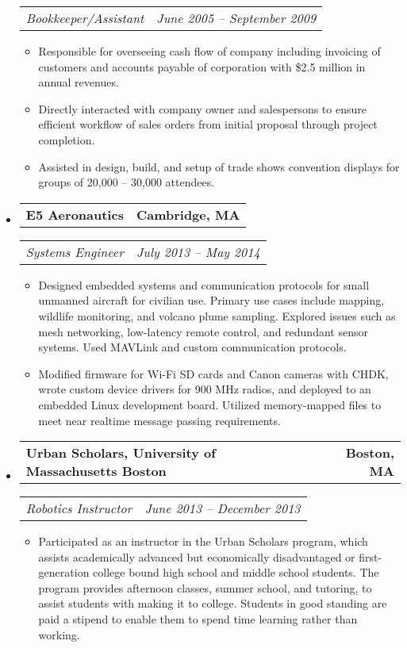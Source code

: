 \documentclass[10pt,letterpaper]{article}
\makeatletter
\newcommand{\headerrow}[2]
{\begin{tabular*}{\linewidth}{l@{\extracolsep{\fill}}r}
	#1 & #2 \\
\end{tabular*}}
\makeatother
\begin{document}
\begin{itemize}
	\headerrow
		{\emph{Bookkeeper/Assistant}}
		{\emph{June 2005 -- September 2009}}
	\begin{itemize}
        \item Responsible for overseeing cash flow of company including
            invoicing of customers and accounts payable of corporation with
            \$2.5 million in annual revenues.

        \item Directly interacted with company owner and salespersons to ensure
            efficient workflow of sales orders from initial proposal through
            project completion.

        \item Assisted in design, build, and setup of trade shows convention
            displays for groups of 20,000 -- 30,000 attendees.
	\end{itemize}

    \item
    \headerrow
		{\textbf{E5 Aeronautics}}
		{\textbf{Cambridge, MA}}
	\headerrow
		{\emph{Systems Engineer}}
		{\emph{July 2013 -- May 2014}}
    \begin{itemize}
        \item Designed embedded systems and communication protocols for small
            unmanned aircraft for civilian use.  Primary use cases include
            mapping, wildlife monitoring, and volcano plume sampling.  Explored
            issues such as mesh networking, low-latency remote control, and
            redundant sensor systems.  Used MAVLink and custom communication
            protocols.

        \item Modified firmware for Wi-Fi SD cards and Canon cameras with CHDK,
            wrote custom device drivers for 900 MHz radios, and deployed to an
            embedded Linux development board.  Utilized memory-mapped files to
            meet near realtime message passing requirements.
    \end{itemize}

    \item
    \headerrow
		{\textbf{Urban Scholars, University of Massachusetts Boston}}
		{\textbf{Boston, MA}}
	\headerrow
		{\emph{Robotics Instructor}}
		{\emph{June 2013 -- December 2013}}
	\begin{itemize}
        \item Participated as an instructor in the Urban Scholars program,
            which assists academically advanced but economically disadvantaged
            or first-generation college bound high school and middle school
            students.  The program provides afternoon classes, summer school,
            and tutoring, to assist students with making it to college.
            Students in good standing are paid a stipend to enable them to
            spend time learning rather than working.


\end{itemize}
\end{itemize}
\end{document}
